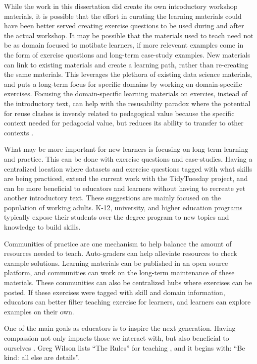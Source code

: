 \documentclass[../main.tex]{subfiles}
\begin{document}
While the work in this dissertation did create its own introductory workshop materials,
it is possible that the effort in curating the learning materials could have been better served creating exercise questions
to be used during and after the actual workshop.
It may be possible that the materials used to teach need not be as domain focused
to motibate learners, if more releveant examples come in the form of exercise questions and long-term case-study examples.
New materials can link to existing materials and create a learning path,
rather than re-creating the same materials.
This leverages the plethora of existing data science materials,
and puts a long-term focus for specific domains by working on domain-specific exercises.
Focusing the domain-specific learning materials on exercies, instead of the introductory text,
can help with the resusability paradox where the potential for reuse clashes is inversly related to pedagogical value
because the specific context needed for pedagocial value, but reduces its ability to transfer to other contexts
\cite{wileyReusabilityParadox2002}.

What may be more important for new learners is focusing on long-term learning and practice.
This can be done with exercise questions and case-studies.
Having a centralized location where datasets and exercise questions tagged with what skills are being practiced,
extend the current work with the TidyTuesday project,
and can be more beneficial to educators and learners without having to recreate yet another
introductory text.
These suggestions are mainly focused on the population of working adults.
K-12, university, and higher education programs typically expose their students
over the degree program to new topics and knowledge to build skills.

Communities of practice are one mechanism to help balance the amount of resources needed to teach.
Auto-graders can help alleviate resources to check example solutions.
Learning materials can be published in an open source platform,
and communities can work on the long-term maintenance of these materials.
These communities can also be centralized hubs where exercises can be posted.
If these exercises were tagged with skill and domain information,
educators can better filter teaching exercise for learners,
and learners can explore examples on their own.

One of the main goals as educators is to inspire the next generation.
Having compassion not only impacts those we interact with, but also beneficial to ourselves
\cite{trzeciakCompassionomics2019}.
Greg Wilson lists ``The Rules'' for teaching \cite{wilson2019teaching}, and it begins with: ``Be kind: all else are details''.
\end{document}
